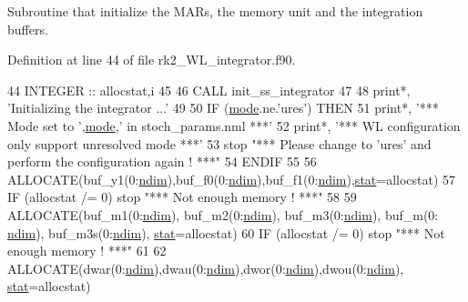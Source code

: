 Subroutine that initialize the M\+A\+Rs, the memory unit and the integration buffers. 



Definition at line 44 of file rk2\+\_\+\+W\+L\+\_\+integrator.\+f90.


\begin{DoxyCode}
44     \textcolor{keywordtype}{INTEGER} :: allocstat,i
45 
46     \textcolor{keyword}{CALL }init\_ss\_integrator
47     
48     print*, \textcolor{stringliteral}{'Initializing the integrator ...'}
49 
50     \textcolor{keywordflow}{IF} (\hyperlink{namespacestoch__params_a2c3f6439fd2d66413d065b533f2a6263}{mode}.ne.\textcolor{stringliteral}{'ures'}) \textcolor{keywordflow}{THEN}
51        print*, \textcolor{stringliteral}{'*** Mode set to '},\hyperlink{namespacestoch__params_a2c3f6439fd2d66413d065b533f2a6263}{mode},\textcolor{stringliteral}{' in stoch\_params.nml ***'}
52        print*, \textcolor{stringliteral}{'*** WL configuration only support unresolved mode ***'}
53        stop \textcolor{stringliteral}{"*** Please change to 'ures' and perform the configuration again ! ***"}
54 \textcolor{keywordflow}{    ENDIF}
55     
56     \textcolor{keyword}{ALLOCATE}(buf\_y1(0:\hyperlink{namespaceparams_a2323fe1773f086e20c14f266351c482b}{ndim}),buf\_f0(0:\hyperlink{namespaceparams_a2323fe1773f086e20c14f266351c482b}{ndim}),buf\_f1(0:\hyperlink{namespaceparams_a2323fe1773f086e20c14f266351c482b}{ndim}),\hyperlink{namespacestat}{stat}=allocstat)
57     \textcolor{keywordflow}{IF} (allocstat /= 0) stop \textcolor{stringliteral}{"*** Not enough memory ! ***"}
58 
59     \textcolor{keyword}{ALLOCATE}(buf\_m1(0:\hyperlink{namespaceparams_a2323fe1773f086e20c14f266351c482b}{ndim}), buf\_m2(0:\hyperlink{namespaceparams_a2323fe1773f086e20c14f266351c482b}{ndim}), buf\_m3(0:\hyperlink{namespaceparams_a2323fe1773f086e20c14f266351c482b}{ndim}), buf\_m(0:
      \hyperlink{namespaceparams_a2323fe1773f086e20c14f266351c482b}{ndim}), buf\_m3s(0:\hyperlink{namespaceparams_a2323fe1773f086e20c14f266351c482b}{ndim}), \hyperlink{namespacestat}{stat}=allocstat)
60     \textcolor{keywordflow}{IF} (allocstat /= 0) stop \textcolor{stringliteral}{"*** Not enough memory ! ***"}
61 
62     \textcolor{keyword}{ALLOCATE}(dwar(0:\hyperlink{namespaceparams_a2323fe1773f086e20c14f266351c482b}{ndim}),dwau(0:\hyperlink{namespaceparams_a2323fe1773f086e20c14f266351c482b}{ndim}),dwor(0:\hyperlink{namespaceparams_a2323fe1773f086e20c14f266351c482b}{ndim}),dwou(0:\hyperlink{namespaceparams_a2323fe1773f086e20c14f266351c482b}{ndim}),
      \hyperlink{namespacestat}{stat}=allocstat)

\end{DoxyCode}
